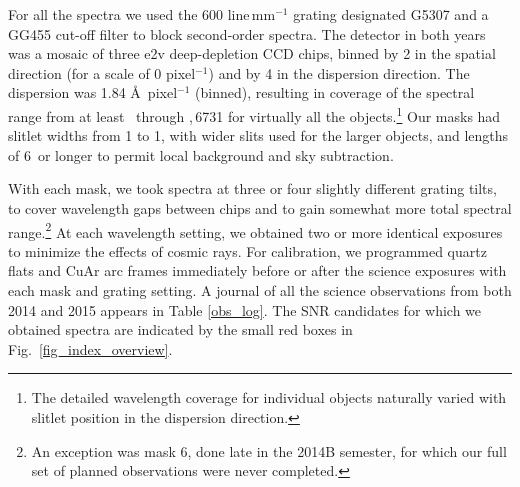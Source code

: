 For all the spectra we used the 600 line\,mm$^{-1}$ grating designated G5307 and a GG455 cut-off filter to block second-order spectra.   The detector in both years was a mosaic of three e2v deep-depletion CCD chips, binned by 2 in the spatial direction (for a scale of 0 pixel$^{-1}$) and by 4 in the dispersion direction.  
The dispersion was 1.84 \AA\,  pixel$^{-1}$ (binned), resulting in coverage of the spectral range from at least \hb\ through \sii{},\,6731 for virtually all the objects.\footnote{The detailed wavelength coverage for individual objects naturally varied with slitlet position in the dispersion direction.}  Our  masks had  slitlet  widths from 1 to 1, with wider slits used for the larger objects, and lengths of 6\arcsec\ or longer to permit local background and sky subtraction.   

With each mask, we took spectra at three or four slightly different grating tilts, to cover wavelength gaps between chips and to gain somewhat more total spectral range.\footnote{An exception was mask 6, done late in the 2014B semester, for which our full set of planned observations were never completed.}  At each wavelength setting, we obtained two or more identical exposures to minimize the effects of cosmic rays.
For calibration, we programmed quartz flats and CuAr arc frames immediately before or after the science exposures with each mask and grating setting.  A journal of all the science observations from both 2014 and 2015 appears in Table \ref{obs_log}.  The SNR candidates for which we obtained spectra are indicated by the small red boxes in Fig.~\ref{fig_index_overview}.


